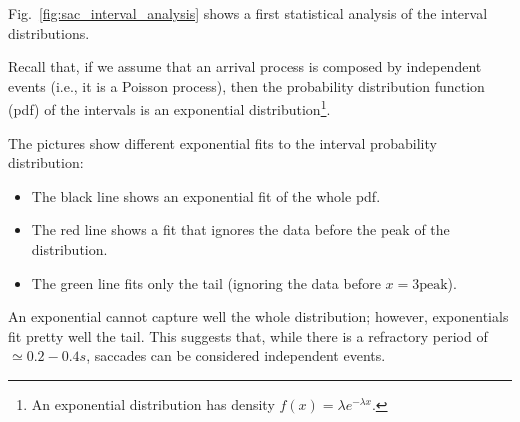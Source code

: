 
Fig.~\ref{fig:sac_interval_analysis} shows a first statistical analysis of the interval distributions.

Recall that, if we assume that an arrival process is composed by independent events (i.e., it is a Poisson process), then the probability distribution function (pdf) of the intervals is an exponential distribution\footnote{An exponential distribution has density $f(x) = \lambda e^{-\lambda x }$.}. 

The pictures show different exponential fits to the interval probability distribution:
\begin{itemize}
\item The black line shows an exponential fit of the whole pdf. 
\item The red line shows a fit that ignores the data before the peak of the distribution. 
\item The green line fits only the tail (ignoring the data before $x = 3 \textrm{peak}$).
\end{itemize}

An exponential cannot capture well the whole distribution; however, exponentials fit pretty well the tail. This suggests that, while there is a refractory period of $\simeq 0.2-0.4s$, saccades can be considered independent events.
